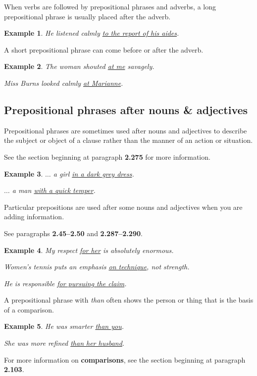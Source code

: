 \documentclass[oneside]{book}
\numberwithin{equation}{section}
\newtheorem{example}{Example}[section]
\begin{document}
%
\noindent{} When verbs are followed by prepositional phrases and adverbs, a long prepositional phrase is usually placed after the adverb.
\begin{example}
    He listened calmly \underline{to the report of his aides}.
\end{example}
A short prepositional phrase can come before or after the adverb.
\begin{example}
    The woman shouted \underline{at me} savagely.
    
    Miss Burns looked calmly \underline{at Marianne}.
\end{example}

\subsection{Prepositional phrases after nouns \& adjectives}
\noindent{} Prepositional phrases are sometimes used after nouns and adjectives to describe the subject or object of a clause rather than the manner of an action or situation.

See the section beginning at paragraph \textbf{2.275} for more information.
\begin{example}
    $\ldots$ a girl \underline{in a dark grey dress}.
    
    $\ldots$ a man \underline{with a quick temper}.
\end{example}
%
\noindent{} Particular prepositions are used after some nouns and adjectives when you are adding information.

See paragraphs \textbf{2.45--2.50} and \textbf{2.287--2.290}.
\begin{example}
    My respect \underline{for her} is absolutely enormous.
    
    Women's tennis puts an emphasis \underline{on technique}, not strength.
    
    He is responsible \underline{for pursuing the claim}.
\end{example}
%
\noindent{} A prepositional phrase with \textit{than} often shows the person or thing that is the basis of a comparison.
\begin{example}
    He was smarter \underline{than you}.
    
    She was more refined \underline{than her husband}.
\end{example}
For more information on \textbf{comparisons}, see the section beginning at paragraph \textbf{2.103}.
\end{document}
